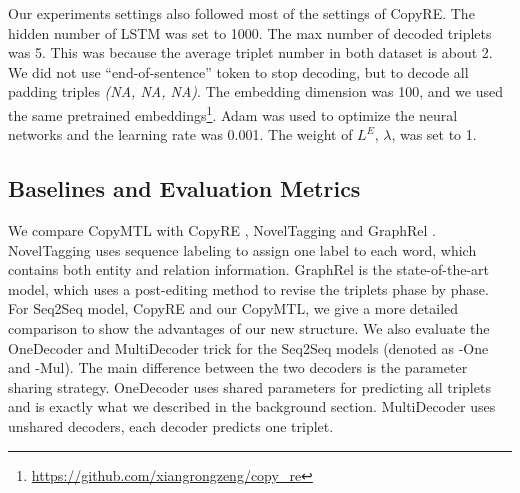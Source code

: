 \documentclass[letterpaper]{article} \usepackage{aaai20}  \usepackage{times}  \usepackage{helvet} \usepackage{courier}  \usepackage[hyphens]{url}  \usepackage{graphicx}
\begin{document}
      Our experiments settings also followed most of the settings of CopyRE.
      The hidden number of LSTM was set to 1000.  
      The max number of decoded triplets was 5. This was because the average triplet number in both dataset is about 2. We did not use ``end-of-sentence'' token to stop decoding, but to decode all padding triples \textit{(NA, NA, NA)}.
      The embedding dimension was 100, and we used the same pretrained embeddings\footnote{\url{https://github.com/xiangrongzeng/copy_re}}.
      Adam \cite{Adam} was used to optimize the neural networks and the learning rate was 0.001. The weight of $L^E$, $\lambda$, was set to 1. 


    
  \subsection{Baselines and Evaluation Metrics}
   


  
  
We compare CopyMTL with CopyRE \cite{CopyRE}, NovelTagging \cite{novel_tagging} and GraphRel \cite{graphrel}. NovelTagging uses sequence labeling to assign one label to each word, which contains both entity and relation information. GraphRel is the state-of-the-art model, which uses a post-editing method to revise the triplets phase by phase. For Seq2Seq model, CopyRE and our CopyMTL, we give a more detailed comparison to show the advantages of our new structure.
We also evaluate the OneDecoder and MultiDecoder trick for the Seq2Seq models (denoted as -One and -Mul).
      The main difference between the two decoders is the parameter sharing strategy. OneDecoder uses shared parameters for predicting all triplets and is exactly what we described in the background section.
MultiDecoder uses unshared decoders, each decoder predicts one triplet.
\end{document}
